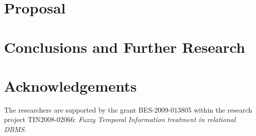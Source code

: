\documentclass{llncs}
\begin{document}
\section{Proposal}
\label{sec:proposal}



%
%
%
\section{Conclusions and Further Research}
\label{sec:futher-research}

%




%
\section*{Acknowledgements}
%
The researchers are supported by the grant BES-2009-013805 within the research project TIN2008-02066: \emph{Fuzzy Temporal Information treatment in relational DBMS}.




\end{document}
